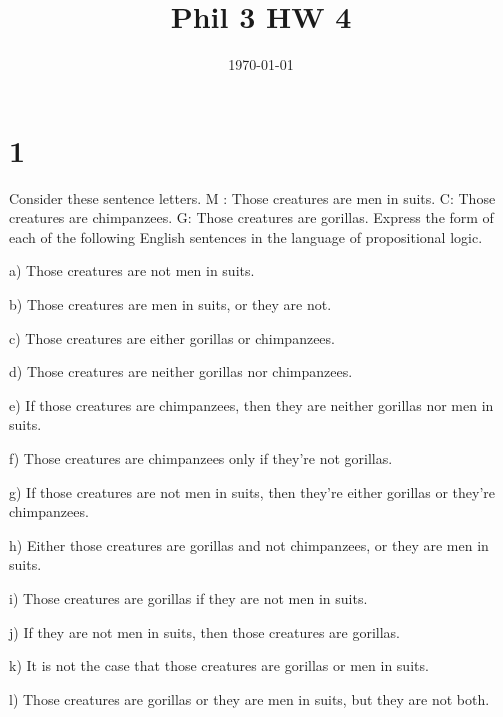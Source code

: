 \documentclass{article}
\title{Phil 3 HW 4}
\date{\today}
\begin{document}
\maketitle

\section*{1}
\begin{ques}\label{q1}
Consider these sentence letters. M : Those creatures are men in suits. C: Those creatures are chimpanzees. G: Those creatures are gorillas. Express the form of each of the following English sentences in the language of propositional logic.

a) Those creatures are not men in suits.

b) Those creatures are men in suits, or they are not.

c) Those creatures are either gorillas or chimpanzees.

d) Those creatures are neither gorillas nor chimpanzees.

e) If those creatures are chimpanzees, then they are neither gorillas nor men in suits.

f) Those creatures are chimpanzees only if they’re not gorillas.

g) If those creatures are not men in suits, then they’re either gorillas or they’re chimpanzees.

h) Either those creatures are gorillas and not chimpanzees, or they are men in suits.

i) Those creatures are gorillas if they are not men in suits.

j) If they are not men in suits, then those creatures are gorillas.

k) It is not the case that those creatures are gorillas or men in suits.

l) Those creatures are gorillas or they are men in suits, but they are not both.
\end{ques}
\end{document}
